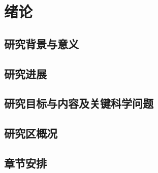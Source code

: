 \chapter{绪论}\label{cha:introduction}

\section{研究背景与意义}\label{sec:background}


\section{研究进展}\label{sec:introduction}


\section{研究目标与内容及关键科学问题}\label{sec:contents}


\section{研究区概况}\label{sec:study_area}



\section{章节安排}\label{sec:chapters_summary}
